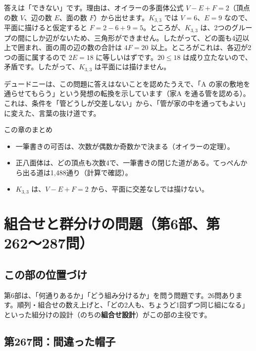 \documentclass[a4paper,11pt,openany]{ltjsbook}
\begin{document}
答えは「できない」です。理由は、オイラーの多面体公式 $V-E+F=2$（頂点の数 $V$、辺の数 $E$、面の数 $F$）から出せます。$K_{3,3}$ では $V=6$、$E=9$ なので、平面に描けると仮定すると $F=2-6+9=5$。ところが、$K_{3,3}$ は、2つのグループの間にしか辺がないため、三角形ができません。したがって、どの面も4辺以上で囲まれ、面の周の辺の数の合計は $4F=20$ 以上。ところがこれは、各辺が2つの面に属するので $2E=18$ に等しいはずです。$20\le18$ は成り立たないので、矛盾です。したがって、$K_{3,3}$ は平面には描けません。

デュードニーは、この問題に答えはないことを認めたうえで、「A の家の敷地を通らせてもらう」という発想の転換を示しています（家A を通る管を認める）。これは、条件を「管どうしが交差しない」から、「管が家の中を通ってもよい」に変えた、言葉の抜け道です。

\begin{pointbox}{この章のまとめ}
\begin{itemize}[leftmargin=*]
\item 一筆書きの可否は、次数が偶数か奇数かで決まる（オイラーの定理）。
\item 正八面体は、どの頂点も次数4で、一筆書きの閉じた道がある。てっぺんから出る道は1,488通り（計算で確認）。
\item $K_{3,3}$ は、$V-E+F=2$ から、平面に交差なしでは描けない。
\end{itemize}
\end{pointbox}

\chapter{組合せと群分けの問題（第6部、第262〜287問）}

\section{この部の位置づけ}

第6部は、「何通りあるか」「どう組み分けるか」を問う問題です。26問あります。順列・組合せの数え上げと、「どの2人も、ちょうど1回ずつ同じ組になる」といった組分けの設計（のちの\textbf{組合せ設計}）がこの部の主役です。

\section{第267問：間違った帽子}
\end{document}
